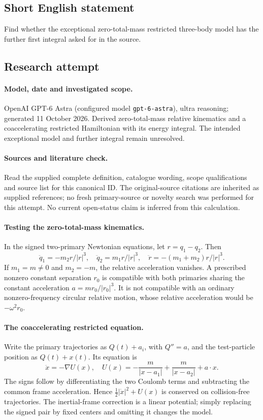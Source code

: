 \documentclass[11pt]{article}
\begin{document}
\subsection{Short English statement}
Find whether the exceptional zero-total-mass restricted three-body model has the further first integral asked for in the source.
\subsection{Research attempt}
\paragraph{Model, date and investigated scope.}
OpenAI GPT-6 Astra (configured model \texttt{gpt-6-astra}), ultra reasoning; generated 11 October 2026. Derived zero-total-mass relative kinematics and a coaccelerating restricted Hamiltonian with its energy integral. The intended exceptional model and further integral remain unresolved.

\paragraph{Sources and literature check.}
Read the supplied complete definition, catalogue wording, scope qualifications and source list for this canonical ID. The original-source citations are inherited as supplied references; no fresh primary-source or novelty search was performed for this attempt. No current open-status claim is inferred from this calculation.

\paragraph{Testing the zero-total-mass kinematics.}In the signed two-primary Newtonian equations, let \(r=q_1-q_2\). Then
\[\ddot q_1=-m_2r/|r|^3,\quad \ddot q_2=m_1r/|r|^3,\quad
\ddot r=-(m_1+m_2)r/|r|^3.
\]
If \(m_1=m\ne0\) and \(m_2=-m\), the relative acceleration vanishes. A prescribed nonzero constant separation \(r_0\) is compatible with both primaries sharing the constant acceleration \(a=mr_0/|r_0|^3\). It is not compatible with an ordinary nonzero-frequency circular relative motion, whose relative acceleration would be \(-\omega^2r_0\).
\paragraph{The coaccelerating restricted equation.}Write the primary trajectories as \(Q(t)+a_i\), with \(Q''=a\), and the test-particle position as \(Q(t)+x(t)\). Its equation is
\[\ddot x=-\nabla U(x),\quad
U(x)=-\frac{m}{|x-a_1|}+\frac{m}{|x-a_2|}+a\cdot x.
\]
The signs follow by differentiating the two Coulomb terms and subtracting the common frame acceleration. Hence \(\tfrac12|\dot x|^2+U(x)\) is conserved on collision-free trajectories. The inertial-frame correction is a linear potential; simply replacing the signed pair by fixed centers and omitting it changes the model.
\end{document}
